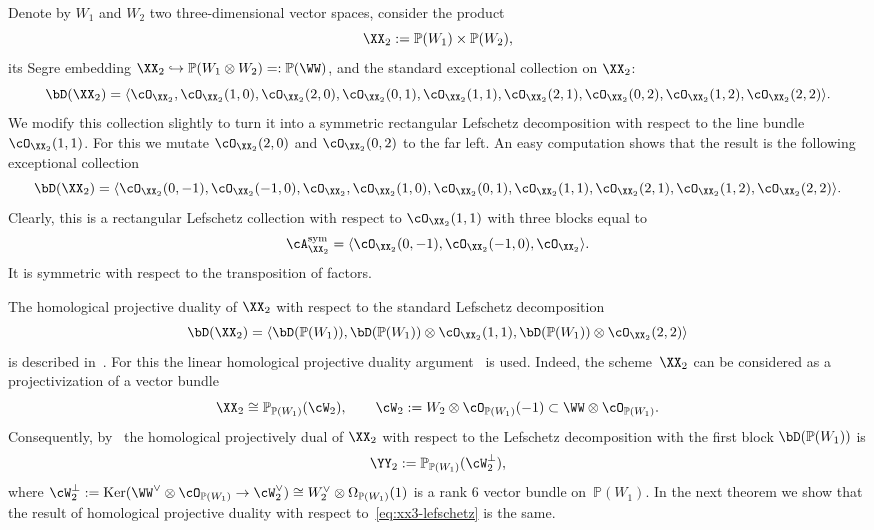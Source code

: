 \documentclass[11pt]{amsart}
\renewcommand{\P}{{\mathbb{P}}}
\DeclareMathOperator{\Ker}{\mathrm{Ker}}
\theoremstyle{plain}
\theoremstyle{definition}
\theoremstyle{remark}
\begin{document}
Denote by $W_1$ and $W_2$ two three-dimensional vector spaces, consider the product
\begin{equation*}
\XX_2 := \P(W_1) \times \P(W_2),
\end{equation*}
its Segre embedding $\XX_2 \hookrightarrow \P(W_1 \otimes W_2) =: \P(\WW)$,
and the standard exceptional collection on ${\XX_2}$:
\begin{equation*}
\bD({\XX_2}) = \langle  \cO_{\XX_2}, \cO_{\XX_2}(1,0), \cO_{\XX_2}(2,0), \cO_{\XX_2}(0,1), \cO_{\XX_2}(1,1), \cO_{\XX_2}(2,1), \cO_{\XX_2}(0,2), \cO_{\XX_2}(1,2), \cO_{\XX_2}(2,2) \rangle. 
\end{equation*}
We modify this collection slightly to turn it into a symmetric rectangular Lefschetz decomposition with respect to the line bundle~$\cO_{\XX_2}(1,1)$.
For this we mutate $\cO_{\XX_2}(2,0)$ and $\cO_{\XX_2}(0,2)$ to the far left.
An easy computation shows that the result is the following exceptional collection
\begin{equation*}
\bD({\XX_2}) = \langle \cO_{\XX_2}(0,-1), \cO_{\XX_2}(-1,0), \cO_{\XX_2}, \cO_{\XX_2}(1,0), \cO_{\XX_2}(0,1), \cO_{\XX_2}(1,1), \cO_{\XX_2}(2,1), \cO_{\XX_2}(1,2), \cO_{\XX_2}(2,2) \rangle. 
\end{equation*}
Clearly, this is a rectangular Lefschetz collection with respect to $\cO_{\XX_2}(1,1)$ with three blocks equal to 
\begin{equation}\label{eq:xx3-lefschetz}
\cA_{\XX_2}^{\rm{sym}} = \langle \cO_{\XX_2}(0,-1), \cO_{\XX_2}(-1,0), \cO_{\XX_2} \rangle. 
\end{equation}
It is symmetric with respect to the transposition of factors.



The homological projective duality of $\XX_2$ with respect to the standard Lefschetz decomposition
\begin{equation*}
\bD(\XX_2) = \langle \bD(\P(W_1)), \bD(\P(W_1)) \otimes \cO_{\XX_2}(1,1), \bD(\P(W_1)) \otimes \cO_{\XX_2}(2,2) \rangle
\end{equation*}
is described in~\cite{bernardara2016determinantal}.
For this the linear homological projective duality argument~\cite[Section~8]{kuznetsov2007hpd} is used.
Indeed, the scheme~${\XX_2}$ can be considered as a projectivization of a vector bundle
\begin{equation*}
{\XX_2} \cong \P_{\P(W_1)}(\cW_2),
\qquad 
\cW_2 := W_2\otimes \cO_{\P(W_1)}(-1) \subset \WW \otimes \cO_{\P(W_1)}.
\end{equation*}
Consequently, by~\cite[Corollary~8.3]{kuznetsov2007hpd} the homological projectively dual of ${\XX_2}$ with respect to the Lefschetz decomposition with the first block $\bD(\P(W_1))$ is
\begin{equation}
\label{eq:def-yy2}
{\YY_2} := \P_{\P(W_1)}(\cW_2^\perp),
\end{equation}
where $\cW_2^\perp := \Ker(\WW^\vee \otimes \cO_{\P(W_1)} \to \cW_2^\vee) \cong W_2^\vee \otimes \Omega_{\P(W_1)}(1)$ is a rank 6 vector bundle on~$\P(W_1)$.
In the next theorem we show that the result of homological projective duality with respect to~\eqref{eq:xx3-lefschetz} is the same.
\end{document}
